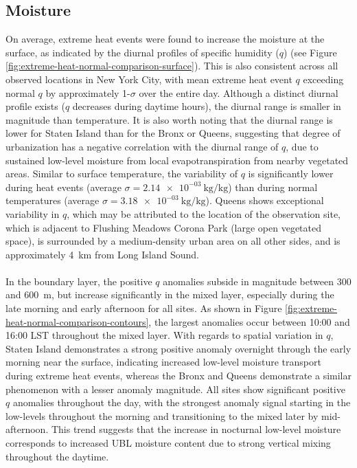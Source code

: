 \documentclass[11pt,a4paper]{article}
\begin{document}
\subsection{Moisture}
On average, extreme heat events were found to increase the moisture at the surface, as indicated by the diurnal profiles of specific humidity ($q$) (see Figure \ref{fig:extreme-heat-normal-comparison-surface}). This is also consistent across all observed locations in New York City, with mean extreme heat event $q$ exceeding normal $q$ by approximately 1-$\sigma$ over the entire day. Although a distinct diurnal profile exists ($q$ decreases during daytime hours), the diurnal range is smaller in magnitude than temperature. It is also worth noting that the diurnal range is lower for Staten Island than for the Bronx or Queens, suggesting that degree of urbanization has a negative correlation with the diurnal range of $q$, due to sustained low-level moisture from local evapotranspiration from nearby vegetated areas. Similar to surface temperature, the variability of $q$ is significantly lower during heat events (average $ \sigma = \SI{2.14e-03}{\kilo\gram\per\kilo\gram} $) than during normal temperatures (average $ \sigma = \SI{3.18e-03}{\kilo\gram\per\kilo\gram} $). Queens shows exceptional variability in $q$, which may be attributed to the location of the observation site, which is adjacent to Flushing Meadows Corona Park (large open vegetated space), is surrounded by a medium-density urban area on all other sides, and is approximately \SI{4}{\kilo\meter} from Long Island Sound. 
\\ \\
In the boundary layer, the positive $q$ anomalies subside in magnitude between 300 and \SI{600}{\meter}, but increase significantly in the mixed layer, especially during the late morning and early afternoon for all sites. As shown in Figure \ref{fig:extreme-heat-normal-comparison-contours}, the largest anomalies occur between 10:00 and 16:00 LST throughout the mixed layer. With regards to spatial variation in $q$, Staten Island demonstrates a strong positive anomaly overnight through the early morning near the surface, indicating increased low-level moisture transport during extreme heat events, whereas the Bronx and Queens demonstrate a similar phenomenon with a lesser anomaly magnitude. All sites show significant positive $q$ anomalies throughout the day, with the strongest anomaly signal starting in the low-levels throughout the morning and transitioning to the mixed later by mid-afternoon. This trend suggests that the increase in nocturnal low-level moisture corresponds to increased UBL moisture content due to strong vertical mixing throughout the daytime.
\end{document}
